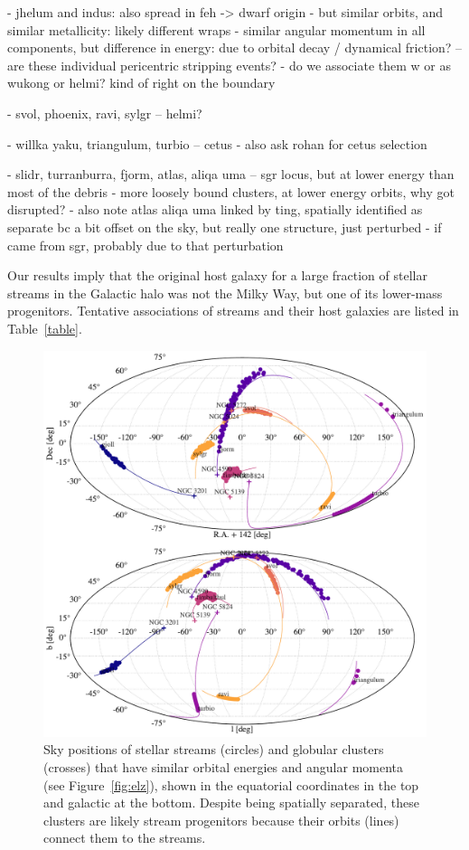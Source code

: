 \documentclass[twocolumn]{aastex63}
\begin{document}
- jhelum and indus: also spread in feh -> dwarf origin
- but similar orbits, and similar metallicity: likely different wraps
- similar angular momentum in all components, but difference in energy: due to orbital decay / dynamical friction?
-- are these individual pericentric stripping events?
- do we associate them w or as wukong or helmi? kind of right on the boundary

- svol, phoenix, ravi, sylgr -- helmi?

- willka yaku, triangulum, turbio -- cetus
- also ask rohan for cetus selection

- slidr, turranburra, fjorm, atlas, aliqa uma -- sgr locus, but at lower energy than most of the debris
- more loosely bound clusters, at lower energy orbits, why got disrupted?
- also note atlas aliqa uma linked by ting, spatially identified as separate bc a bit offset on the sky, but really one structure, just perturbed
- if came from sgr, probably due to that perturbation

Our results imply that the original host galaxy for a large fraction of stellar streams in the Galactic halo was not the Milky Way, but one of its lower-mass progenitors.
Tentative associations of streams and their host galaxies are listed in Table~\ref{table}.


\begin{figure}
\begin{center}
\includegraphics[width=\textwidth]{sky_orbits.pdf}
\end{center}
\caption{
Sky positions of stellar streams (circles) and globular clusters (crosses) that have similar orbital energies and angular momenta (see Figure~\ref{fig:elz}), shown in the equatorial coordinates in the top and galactic at the bottom.
Despite being spatially separated, these clusters are likely stream progenitors because their orbits (lines) connect them to the streams.
}
\label{fig:sky}
\end{figure}
\end{document}
